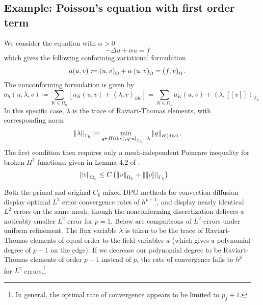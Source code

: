 \documentclass[final,leqno]{siamltex}
\newcommand{\nor}[1]{\left\| #1 \right\|}
\newcommand{\LRp}[1]{\left( #1 \right)}
\newcommand{\LRs}[1]{\left[ #1 \right]}
\newcommand{\LRa}[1]{\left\langle #1 \right\rangle}
\newcommand{\jump}[1] {\ensuremath{\LRs{\!\left[#1\right]\!}}}
\newcommand{\Gh}{\Gamma_h}
\newcommand{\Oh}{\Omega_h}
\let\grad\relax
\newcommand{\grad}{\nabla}
\begin{document}
\subsection{Example: Poisson's equation with first order term} 

We consider the equation with $\alpha > 0$
\[
-\Delta u + \alpha u = f
\]
which gives the following conforming variational formulation
\[
a(u,v) \coloneqq \LRp{\grad u,\grad v}_{\Omega} + \alpha\LRp{u,v}_{\Omega} = \LRp{f,v}_{\Omega}.
\]
The nonconforming formulation is given by 
\[
a_h(u,\lambda,v) \coloneqq \sum_{K \in \Oh}\LRs{ a_K(u,v) + \LRa{\lambda,v}_{\partial K}} = \sum_{K \in \Oh} a_K(u,v) + \LRa{\lambda,\jump{v}}_{\Gh}
\]
In this specific case, $\lambda$ is the trace of Raviart-Thomas elements, with corresponding norm
\[
\nor{\lambda}_{\Gh} \coloneqq \min_{q\in H({\rm div}), \left.q\cdot n\right|_{\Gh} = \lambda} \nor{q}_{H({\rm div})}.
\]
The first condition then requires only a mesh-independent Poincare inequality for broken $H^1$ functions, given in Lemma 4.2 of \cite{analysisDPG}.  
\begin{align*}
\nor{v}_{\Oh} &\leq C\LRp{\nor{\grad v}_{\Oh} + \nor{\jump{v}}_{\Gh}}
\end{align*}

Both the primal and original $C_0$ mixed DPG methods for convection-diffusion display optimal $L^2$ error convergence rates of $h^{p+1}$, and display nearly identical $L^2$ errors on the same mesh, though the nonconforming discretization delivers a noticably smaller $L^2$ error for $p=1$.  Below are comparisons of $L^2$-errors under uniform refinement.  The flux variable $\lambda$ is taken to be the trace of Raviart-Thomas elements of equal order to the field variables $u$ (which gives a polynomial degree of $p-1$ on the edge).  If we decrease our polynomial degree to be Raviart-Thomas elements of order $p-1$ instead of $p$, the rate of convergence falls to $h^p$ for $L^2$ errors.\footnote{In general, the optimal rate of convergence appears to be limited to $p_f+1$.}
%
\end{document}
